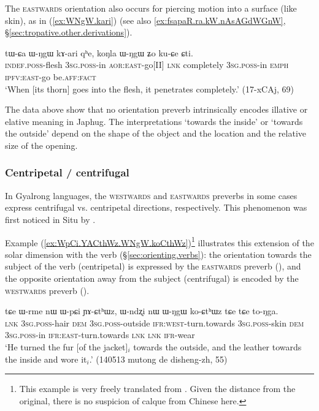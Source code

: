 The \textsc{eastwards} orientation also occurs for piercing motion into a surface (like skin), as in (\ref{ex:WNgW.kari}) (see also \ref{ex:fsapaR.ra.kW.nAsAGdWGnW}, §\ref{sec:tropative.other.derivations}).

\begin{exe}
\ex \label{ex:WNgW.kari}
\gll  tɯ-ɕa ɯ-ŋgɯ kɤ-ari qʰe, koŋla ɯ-ŋgɯ ʑo ku-ɕe ɕti. \\
\textsc{indef}.\textsc{poss}-flesh \textsc{3sg}.\textsc{poss}-in \textsc{aor}:\textsc{east}-go[II] \textsc{lnk} completely \textsc{3sg}.\textsc{poss}-in \textsc{emph} \textsc{ipfv}:\textsc{east}-go be.\textsc{aff}:\textsc{fact} \\
\glt `When [its thorn] goes into the flesh, it penetrates completely.' (17-xCAj, 69)
 \end{exe} 

The data above show that no orientation preverb intrinsically encodes illative or elative meaning in Japhug. The interpretations `towards the inside' or `towards the outside' depend on the shape of the object and the location and the relative size of the opening.
 
\subsubsection{Centripetal / centrifugal} \label{sec:centripetal.centrifugal}
In Gyalrong languages, the \textsc{westwards} and \textsc{eastwards} preverbs in some cases express centrifugal vs. centripetal directions, respectively. This phenomenon was first noticed in Situ by \citet[228--229]{linxr93jiarong}.
 
Example (\ref{ex:WpCi.YACthWz.WNgW.koCthWz})\footnote{This example is very freely translated from . Given the distance from the original, there is no suspicion of calque from Chinese here. } illustrates this extension of the solar dimension with the verb  (§\ref{sec:orienting.verbs}): the orientation towards the subject of the verb (centripetal) is expressed by the \textsc{eastwards} preverb (), and the opposite orientation away from the subject (centrifugal) is encoded by the \textsc{westwards} preverb ().

\begin{exe}
\ex \label{ex:WpCi.YACthWz.WNgW.koCthWz}
\gll  tɕe ɯ-rme nɯ ɯ-pɕi ɲɤ-ɕtʰɯz, ɯ-ndʐi nɯ ɯ-ŋgɯ ko-ɕtʰɯz tɕe tɕe to-ŋga.  \\
\textsc{lnk} \textsc{3sg}.\textsc{poss}-hair \textsc{dem} \textsc{3sg}.\textsc{poss}-outside \textsc{ifr}:\textsc{west}-turn.towards \textsc{3sg}.\textsc{poss}-skin \textsc{dem} \textsc{3sg}.\textsc{poss}-in \textsc{ifr}:\textsc{east}-turn.towards \textsc{lnk} \textsc{lnk} \textsc{ifr}-wear \\
\glt `He turned the fur [of the jacket]$_i$ towards the outside, and the leather towards the inside and wore it$_i$.' (140513 mutong de disheng-zh, 55)
\end{exe}  

